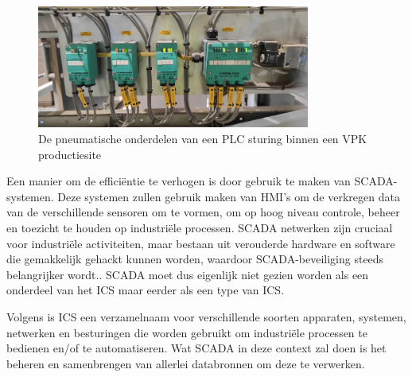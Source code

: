 \begin{figure}[H]
    \centering
    \includegraphics[width=0.8\textwidth]{fotos/PLC_pneumatica.jpg}
    \caption[Pneumatica PLC]{\label{fig:PLC_pneumatica}De pneumatische onderdelen van een PLC sturing binnen een VPK productiesite}
\end{figure} 

Een manier om de efficiëntie te verhogen is door gebruik te maken van SCADA-systemen. 
Deze systemen zullen gebruik maken van HMI’s om de verkregen data van de verschillende sensoren om te vormen, om op hoog niveau controle, beheer en toezicht te houden op industriële processen. SCADA netwerken zijn cruciaal voor industriële activiteiten, maar bestaan uit verouderde hardware en software die gemakkelijk gehackt kunnen worden, waardoor SCADA-beveiliging steeds belangrijker wordt.\autocite{FortinetSC2025}. SCADA moet dus eigenlijk niet gezien worden als een onderdeel van het ICS maar eerder als een type van ICS.

\vspace{5mm} 
Volgens \textcite{Mhaskar2021} is ICS een verzamelnaam voor verschillende soorten apparaten, systemen, netwerken en besturingen die worden gebruikt om industriële processen te bedienen en/of te automatiseren. Wat SCADA in deze context zal doen is het beheren en samenbrengen van allerlei databronnen om deze te verwerken.


